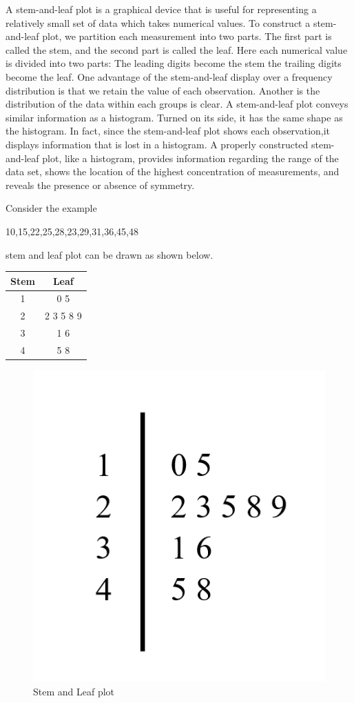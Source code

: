 \documentclass[
]{book}
\begin{document}
A stem-and-leaf plot is a graphical device that is useful for representing a relatively small set of data which takes numerical values. To construct a stem-and-leaf plot, we partition each measurement into two parts. The first part is called the stem, and the second part is called the leaf. Here each numerical value is divided into two parts:
The leading digits become the stem the trailing digits become the leaf. One advantage of the stem-and-leaf display over a frequency distribution is that we retain the value of each observation. Another is the distribution of the data within each groups is clear. A stem-and-leaf plot conveys similar information as a histogram. Turned on its side, it has the same shape as the histogram. In fact, since the
stem-and-leaf plot shows each observation,it displays information that is lost in a histogram. A properly
constructed stem-and-leaf plot, like a histogram, provides information regarding the range of the data set, shows the location of the highest concentration of measurements, and reveals the presence or absence of symmetry.

Consider the example

10,15,22,25,28,23,29,31,36,45,48

stem and leaf plot can be drawn as shown below.

\begin{table}[H]
\centering
\begin{tabular}[t]{cc}
\toprule
Stem & Leaf\\
\midrule
1 & 0 5\\
2 & 2 3 5 8 9\\
3 & 1 6\\
4 & 5 8\\
\bottomrule
\end{tabular}
\end{table}
\begin{figure}

{\centering \includegraphics[width=0.3\linewidth]{images/image18} 

}

\caption{Stem and Leaf plot}\label{fig:stem}
\end{figure}
\end{document}
